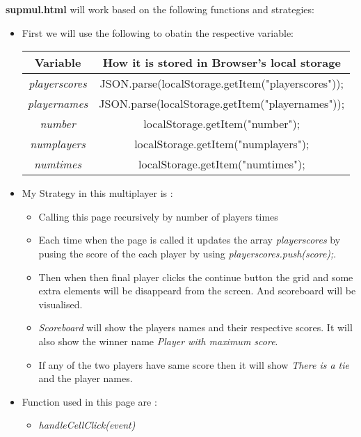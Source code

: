 \documentclass[a4paper, 11pt]{article}
\begin{document}
   \textbf{supmul.html} will work based on the following functions and strategies:
    \begin{itemize}
        \item First we will use the following to obatin the respective variable:\\
    \begin{tabular}{|c|c|}
        \hline
        \textbf{Variable} & \textbf{How it is stored in Browser's local storage} \\
        \hline
        \textit{playerscores} & JSON.parse(localStorage.getItem("playerscores")); \\ \hline
        \textit{playernames} & JSON.parse(localStorage.getItem("playernames"));\\ \hline
        \textit{number} & localStorage.getItem("number"); \\ \hline
        \textit{numplayers} & localStorage.getItem("numplayers");\\ \hline
        \textit{numtimes} & localStorage.getItem("numtimes");\\
        \hline 
        \end{tabular}
        \item My Strategy in this multiplayer is :
          \begin{itemize}
              \item Calling this page recursively by number of players times
               \item Each time when the page is called it updates the array \textit{playerscores} by pusing the score of the each player by using \textit{playerscores.push(score);}.
                \item Then when then final player clicks the continue button the grid and some extra elements will be disappeard from the screen. And scoreboard will be visualised.
                \item \textit{Scoreboard} will show the players names and their respective scores. It will also show the winner name \textit{Player with maximum score}. 
                \item If any of the two players have same score then it will show \textit{There is a tie } and the player names.
          \end{itemize}
        \item Function used in this page are :
            \begin{itemize}
                \item \textit{handleCellClick(event)}

\end{itemize}
\end{itemize}
\end{document}
